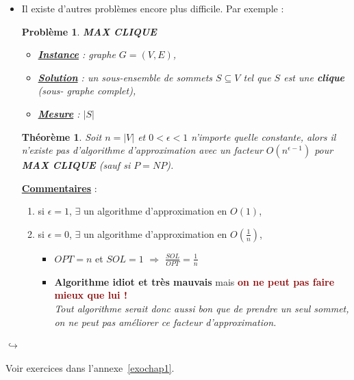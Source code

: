 \documentclass{article}
\newcommand{\rouge}[1]{\textcolor{darkred}{#1}}
\newtheorem{thm}{Th\'eor\`eme}[section]
\newtheorem{pbm}{Problème}[section]
\begin{document}
\begin{sffamily}
\begin{itemize}
\item Il existe d'autres problèmes encore plus difficile. Par exemple :\\
\indent \hbox{}
\begin{pbm} \textbf{MAX CLIQUE}
\begin{itemize}
\item[*]\textbf{\underline{Instance}} : graphe $G=(V,E)$,
\item[*]\textbf{\underline{Solution}} : un sous-ensemble de sommets $S \subseteq V$ tel que $S$ est une \textbf{clique} \textit{(sous-
graphe complet)},
\item[*]\textbf{\underline{Mesure}} : $|S|$
\end{itemize}
\indent \hbox{}
\end{pbm}

\begin{thm}Soit $n = |V|$ et $0 < \epsilon < 1$ n'importe quelle constante, alors il n'existe pas d'algorithme d'approximation avec un 
facteur $O(n^{\epsilon-1})$ pour \textbf{MAX CLIQUE} \textit{(sauf si $P = NP$)}.\end{thm}

\textbf{\underline{Commentaires}} : 
\begin{enumerate}
\item si $\epsilon = 1$, $\exists$ un algorithme d'approximation en $O(1)$,
\item si $\epsilon = 0$, $\exists$ un algorithme d'approximation en $O(\frac{1}{n})$,
\begin{itemize}
\item[$\rightarrow$] $OPT = n$ et $SOL = 1$ $\Rightarrow$ $\frac{SOL}{OPT} = \frac{1}{n}$
\item[$\rightarrow$] \textbf{Algorithme idiot et très mauvais} mais \rouge{\textbf{on ne peut pas faire mieux que lui !}} \\
\textit{Tout algorithme serait donc aussi bon que de prendre un seul sommet, on ne peut pas améliorer ce facteur d'approximation.}
\end{itemize}
\end{enumerate}
\end{itemize}
\vspace{25em}
\begin{flushright}
$\hookrightarrow$ \begin{large}Voir exercices dans l'annexe~\ref{exochap1}.\end{large}
\end{flushright}


\end{sffamily}
\end{document}
